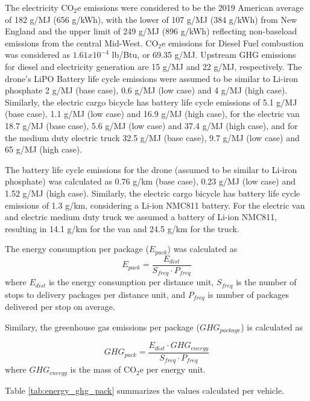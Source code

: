 \documentclass{article}
\begin{document}
The electricity CO$_{2}$e emissions were considered to be the 2019 American average of 182 g/MJ (656 g/kWh), with the lower of 107 g/MJ (384 g/kWh) from New England and the upper limit of 249 g/MJ (896 g/kWh) reflecting non-baseload emissions from the central Mid-West\cite{USEPA2019EmissionseGRID}.
CO$_{2}$e emissions for Diesel Fuel combustion was considered as $1.61x10^{-4}$ lb/Btu\cite{U.S.EnergyInformationAdministrationEIA2020HowBurned}, or 69.35 g/MJ. Upstream GHG emissions for diesel and electricity generation are 15 g/MJ and 22 g/MJ\cite{Laboratory2020GREET}, respectively. The drone’s LiPO Battery life cycle emissions were assumed to be similar to Li-iron phosphate 2 g/MJ (base case), 0.6  g/MJ (low case) and 4 g/MJ (high case)\cite{Laboratory2020GREET}. Similarly, the electric cargo bicycle has battery life cycle emissions of 5.1 g/MJ (base case), 1.1  g/MJ (low case) and 16.9 g/MJ (high case), for the electric van 18.7 g/MJ (base case), 5.6  g/MJ (low case) and 37.4 g/MJ (high case), and for the medium duty electric truck  32.5 g/MJ (base case), 9.7  g/MJ (low case) and 65 g/MJ (high case).

The battery life cycle emissions for the drone (assumed to be similar to Li-iron phosphate) was calculated as 0.76 g/km (base case), 0.23  g/MJ (low case) and 1.52 g/MJ (high case). Similarly, the electric cargo bicycle has battery life cycle emissions of 1.3 g/km, considering a Li-ion NMC811 battery. For the electric van and electric medium duty truck we assumed a battery of Li-ion NMC811, resulting in 14.1 g/km for the van and 24.5 g/km for the truck.\cite{Laboratory2020GREET}

The energy consumption per package ($E_{pack}$) was calculated as
\begin{equation}
    E_{pack} = \frac{E_{dist}}{S_{freq}\cdot P_{freq}}
\end{equation}
where $E_{dist}$ is the energy consumption per distance unit, $S_{freq}$ is the number of stops to delivery packages per distance unit, and $P_{freq}$ is number of packages delivered per stop on average. 

Similary, the greenhouse gas emissions per package ($GHG_{package}$) is calculated as 

\begin{equation}
    GHG_{pack} = \frac{E_{dist}\cdot GHG_{energy}}{S_{freq}\cdot P_{freq}}
\end{equation}
where $GHG_{energy}$ is the mass of CO$_{2}$e per energy unit.
 

Table \ref{tab:energy_ghg_pack} summarizes the values calculated per vehicle.
\end{document}
